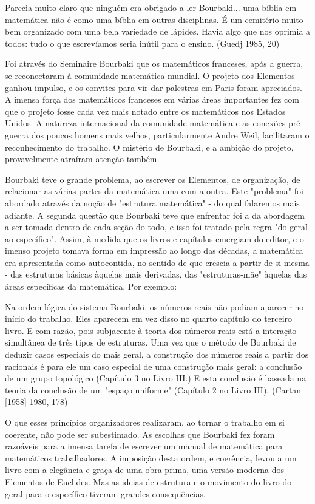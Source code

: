 \documentclass[12pt]{article}
\begin{document}
Parecia muito claro que ninguém era obrigado a ler Bourbaki... uma bíblia em matemática não é como uma bíblia em outras disciplinas. É um cemitério muito bem organizado com uma bela variedade de lápides.  Havia algo que nos oprimia a todos: tudo o que escrevíamos seria inútil para o ensino. (Guedj 1985, 20)

Foi através do Seminaire Bourbaki que os matemáticos franceses, após a guerra, se reconectaram à comunidade matemática mundial. O projeto dos Elementos ganhou impulso, e os convites para vir dar palestras em Paris foram apreciados. A imensa força dos matemáticos franceses em várias áreas importantes fez com que o projeto fosse cada vez mais notado entre os matemáticos nos Estados Unidos. A natureza internacional da comunidade matemática e as conexões pré-guerra dos poucos homens mais velhos, particularmente Andre Weil, facilitaram o reconhecimento do trabalho. O mistério de Bourbaki, e a ambição do projeto, provavelmente atraíram atenção também.

Bourbaki teve o grande problema, ao escrever os Elementos, de organização, de relacionar as várias partes da matemática uma com a outra. Este "problema" foi abordado através da noção de "estrutura matemática" - do qual falaremos mais adiante. A segunda questão que Bourbaki teve que enfrentar foi a da abordagem a ser tomada dentro de cada seção do todo, e isso foi tratado pela regra "do geral ao específico". Assim, à medida que os livros e capítulos emergiam do editor, e o imenso projeto tomava forma em impressão ao longo das décadas, a matemática era apresentada como autocontida, no sentido de que crescia a partir de si mesma - das estruturas básicas àquelas mais derivadas, das "estruturas-mãe" àquelas das áreas específicas da matemática. Por exemplo:

Na ordem lógica do sistema Bourbaki, os números reais não podiam aparecer no início do trabalho. Eles aparecem em vez disso no quarto capítulo do terceiro livro. E com razão, pois subjacente à teoria dos números reais está a interação simultânea de três tipos de estruturas. Uma vez que o método de Bourbaki de deduzir casos especiais do mais geral, a construção dos números reais a partir dos racionais é para ele um caso especial de uma construção mais geral: a conclusão de um grupo topológico (Capítulo 3 no Livro III.) E esta conclusão é baseada na teoria da conclusão de um "espaço uniforme" (Capítulo 2 no Livro III). (Cartan [1958] 1980, 178)

O que esses princípios organizadores realizaram, ao tornar o trabalho em si coerente, não pode ser subestimado. As escolhas que Bourbaki fez foram razoáveis para a imensa tarefa de escrever um manual de matemática para matemáticos trabalhadores. A imposição desta ordem, e coerência, levou a um livro com a elegância e graça de uma obra-prima, uma versão moderna dos Elementos de Euclides. Mas as ideias de estrutura e o movimento do livro do geral para o específico tiveram grandes consequências.
\end{document}
